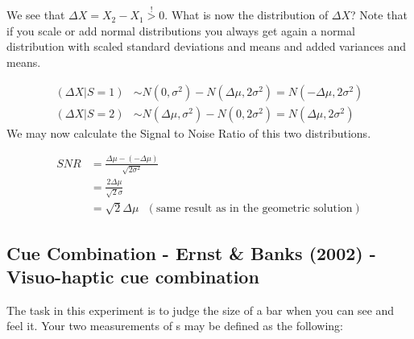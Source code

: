 \documentclass[../main/Notes.tex]{subfiles}
\begin{document}

We see that $\Delta X= X_{2}-X_{1} \stackrel{!}{>}0$. What is now the distribution of $\Delta X$? Note that if you scale or add normal distributions you always get again a normal distribution with scaled standard deviations and means and added variances and means.

\begin{align*}
\left(\Delta X | S = 1\right) &\sim N\left(0, \sigma^{2}\right) - N\left( \Delta \mu , 2\sigma^{2}\right) = N\left( -\Delta \mu , 2\sigma^{2}\right)\\
\left(\Delta X | S = 2\right) &\sim N\left(\Delta \mu, \sigma^{2}\right) - N\left(0, 2\sigma^{2}\right) = N \left( \Delta \mu , 2\sigma^{2}\right)
\end{align*}
We may now calculate the Signal to Noise Ratio of this two distributions.

\begin{minipage}[b][3cm][t]{3.5cm}
\end{minipage}
\begin{minipage}[b][3.5cm][t]{8cm}
\begin{align*}
SNR &= \frac{\Delta\mu - (-\Delta\mu)}{\sqrt{2\sigma^2}}\\
    &= \frac{2\Delta\mu}{\sqrt{2}\sigma}\\
    &= \sqrt{2}\Delta\mu ~~~\left(\text{same result as in the geometric solution}\right)
\end{align*}
\end{minipage}

\subsection{Cue Combination - Ernst \& Banks (2002) - Visuo-haptic cue combination}
The task in this experiment is to judge the size of a bar when you can see and feel it. Your two measurements of s may be defined as the following:
\end{document}
